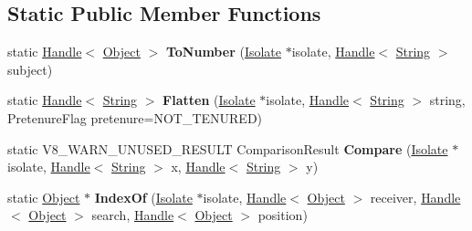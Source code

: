 \subsection*{Static Public Member Functions}
\begin{DoxyCompactItemize}
\item 
\mbox{\label{classv8_1_1internal_1_1String_a6666d44cd4bfe69a9984d5092d3e1df9}} 
static \mbox{\hyperlink{classv8_1_1internal_1_1Handle}{Handle}}$<$ \mbox{\hyperlink{classv8_1_1internal_1_1Object}{Object}} $>$ {\bfseries To\+Number} (\mbox{\hyperlink{classv8_1_1internal_1_1Isolate}{Isolate}} $\ast$isolate, \mbox{\hyperlink{classv8_1_1internal_1_1Handle}{Handle}}$<$ \mbox{\hyperlink{classv8_1_1internal_1_1String}{String}} $>$ subject)
\item 
\mbox{\label{classv8_1_1internal_1_1String_aa32eca77a9d2a426a8ebd2d7ef048cdd}} 
static \mbox{\hyperlink{classv8_1_1internal_1_1Handle}{Handle}}$<$ \mbox{\hyperlink{classv8_1_1internal_1_1String}{String}} $>$ {\bfseries Flatten} (\mbox{\hyperlink{classv8_1_1internal_1_1Isolate}{Isolate}} $\ast$isolate, \mbox{\hyperlink{classv8_1_1internal_1_1Handle}{Handle}}$<$ \mbox{\hyperlink{classv8_1_1internal_1_1String}{String}} $>$ string, Pretenure\+Flag pretenure=N\+O\+T\+\_\+\+T\+E\+N\+U\+R\+ED)
\item 
\mbox{\label{classv8_1_1internal_1_1String_ab1bf3b55eb9e7a7794307b4160806fe2}} 
static V8\+\_\+\+W\+A\+R\+N\+\_\+\+U\+N\+U\+S\+E\+D\+\_\+\+R\+E\+S\+U\+LT Comparison\+Result {\bfseries Compare} (\mbox{\hyperlink{classv8_1_1internal_1_1Isolate}{Isolate}} $\ast$isolate, \mbox{\hyperlink{classv8_1_1internal_1_1Handle}{Handle}}$<$ \mbox{\hyperlink{classv8_1_1internal_1_1String}{String}} $>$ x, \mbox{\hyperlink{classv8_1_1internal_1_1Handle}{Handle}}$<$ \mbox{\hyperlink{classv8_1_1internal_1_1String}{String}} $>$ y)
\item 
\mbox{\label{classv8_1_1internal_1_1String_afca0b82e09ac78c2c5bdc02078ecf133}} 
static \mbox{\hyperlink{classv8_1_1internal_1_1Object}{Object}} $\ast$ {\bfseries Index\+Of} (\mbox{\hyperlink{classv8_1_1internal_1_1Isolate}{Isolate}} $\ast$isolate, \mbox{\hyperlink{classv8_1_1internal_1_1Handle}{Handle}}$<$ \mbox{\hyperlink{classv8_1_1internal_1_1Object}{Object}} $>$ receiver, \mbox{\hyperlink{classv8_1_1internal_1_1Handle}{Handle}}$<$ \mbox{\hyperlink{classv8_1_1internal_1_1Object}{Object}} $>$ search, \mbox{\hyperlink{classv8_1_1internal_1_1Handle}{Handle}}$<$ \mbox{\hyperlink{classv8_1_1internal_1_1Object}{Object}} $>$ position)

\end{DoxyCompactItemize}
